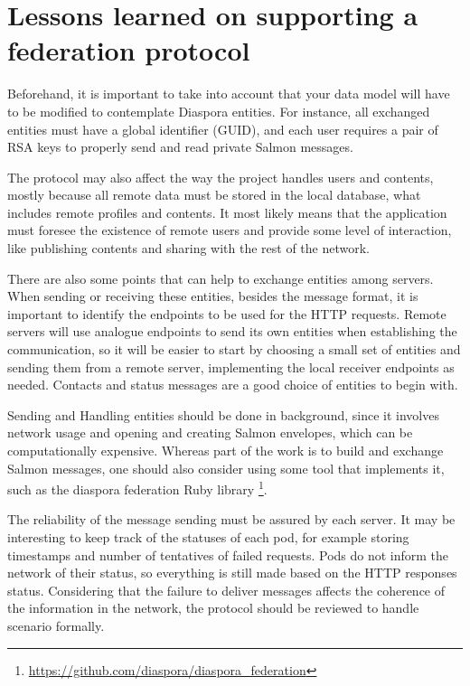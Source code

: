 \section{Lessons learned on supporting a federation protocol}

Beforehand, it is important to take into account that your data model will have
to be modified to contemplate Diaspora entities. For instance, all exchanged
entities must have a global identifier (GUID), and each user requires a pair of
RSA keys to properly send and read private Salmon messages.

The protocol may also affect the way the project handles users and contents,
mostly because all remote data must be stored in the local database, what
includes remote profiles and contents. It most likely means that the
application must foresee the existence of remote users and provide some level
of interaction, like publishing contents and sharing with the rest of the
network.

There are also some points that can help to exchange entities among servers.
When sending or receiving these entities, besides the message format, it is
important to identify the endpoints to be used for the HTTP requests. Remote
servers will use analogue endpoints to send its own entities when establishing
the communication, so it will be easier to start by choosing a small set of
entities and sending them from a remote server, implementing the local receiver
endpoints as needed. Contacts and status messages are a good choice of entities
to begin with.

Sending and Handling entities should be done in background, since it
involves network usage and opening and creating Salmon envelopes, which
can be computationally expensive. Whereas part of the work is to build
and exchange Salmon messages, one should also consider using some tool
that implements it, such as the diaspora federation Ruby library
\footnote{\url{https://github.com/diaspora/diaspora_federation}}.

The reliability of the message sending must be assured by each server. It may
be interesting to keep track of the statuses of each pod, for example storing
timestamps and number of tentatives of failed requests. Pods do not inform the
network of their status, so everything is still made based on the HTTP
responses status. Considering that the failure to deliver messages affects the
coherence of the information in the network, the protocol should be reviewed to
handle scenario formally.

